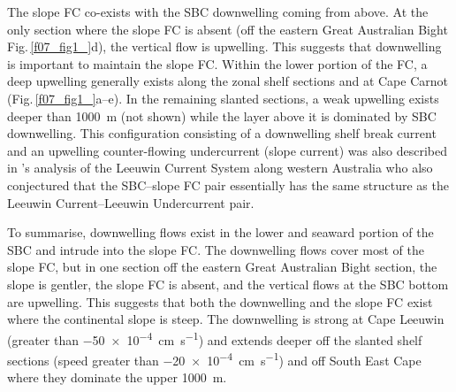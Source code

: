 \documentclass[preprint,3p,review,12pt]{elsarticle}
\newcommand{\citepos}[1]{\citeauthor{#1}'s \citeyearpar{#1}}
\begin{document}
The slope FC co-exists with the SBC downwelling coming from above. At the only section where the slope FC is absent (off the eastern Great Australian Bight Fig.\,\ref{f07_fig1_}d), the vertical flow is upwelling.
This suggests that downwelling is important to maintain the slope FC\@.
%
Within the lower portion of the FC, a deep upwelling generally exists along the zonal shelf sections and at Cape Carnot (Fig.\,\ref{f07_fig1_}a--e).
In the remaining slanted sections, a weak upwelling exists deeper than \SI{1000}{\meter} (not shown) while
the layer above it is dominated by SBC downwelling.
%
This configuration consisting of a downwelling shelf break current and an upwelling counter-flowing undercurrent (slope current) was also described in \citepos{Woo2008} analysis of the Leeuwin Current System along western Australia who also conjectured that the SBC--slope FC pair essentially has the same structure as the Leeuwin Current--Leeuwin Undercurrent pair.

To summarise, downwelling flows exist in the lower and seaward portion of the SBC and intrude into the slope FC\@.
The downwelling flows cover most of the slope FC, but 
in one section off the eastern Great Australian Bight section, the slope is gentler, the slope FC is absent, and the vertical flows at the SBC bottom are upwelling. This suggests that both the downwelling and the slope FC exist where the continental slope is steep. The downwelling is strong at Cape Leeuwin (greater than \SI{-50 e-4}{\centi\meter\per\second}) and extends deeper off the slanted shelf sections (speed greater than \SI{-20 e-4}{\centi\meter\per\second}) and off South East Cape where they dominate the upper \SI{1000}{\meter}. 
\end{document}
